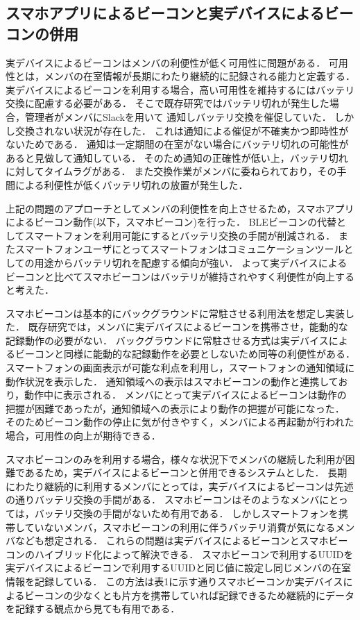 
\subsection{スマホアプリによるビーコンと実デバイスによるビーコンの併用}


実デバイスによるビーコンはメンバの利便性が低く可用性に問題がある．
可用性とは，メンバの在室情報が長期にわたり継続的に記録される能力と定義する．
実デバイスによるビーコンを利用する場合，高い可用性を維持するにはバッテリ交換に配慮する必要がある．
そこで既存研究ではバッテリ切れが発生した場合，管理者がメンバにSlackを用いて
通知しバッテリ交換を催促していた．
しかし交換されない状況が存在した．
これは通知による催促が不確実かつ即時性がないためである．
通知は一定期間の在室がない場合にバッテリ切れの可能性があると見做して通知している．
そのため通知の正確性が低い上，バッテリ切れに対してタイムラグがある．
また交換作業がメンバに委ねられており，その手間による利便性が低くバッテリ切れの放置が発生した．


上記の問題のアプローチとしてメンバの利便性を向上させるため，スマホアプリによるビーコン動作(以下，スマホビーコン)を行った．
BLEビーコンの代替としてスマートフォンを利用可能にするとバッテリ交換の手間が削減される．
またスマートフォンユーザにとってスマートフォンはコミュニケーションツールとしての用途からバッテリ切れを配慮する傾向が強い．
よって実デバイスによるビーコンと比べてスマホビーコンはバッテリが維持されやすく利便性が向上すると考えた．

スマホビーコンは基本的にバックグラウンドに常駐させる利用法を想定し実装した．
既存研究では，メンバに実デバイスによるビーコンを携帯させ，能動的な記録動作の必要がない．
バックグラウンドに常駐させる方式は実デバイスによるビーコンと同様に能動的な記録動作を必要としないため同等の利便性がある．
スマートフォンの画面表示が可能な利点を利用し，スマートフォンの通知領域に動作状況を表示した．
通知領域への表示はスマホビーコンの動作と連携しており，動作中に表示される．
メンバにとって実デバイスによるビーコンは動作の把握が困難であったが，通知領域への表示により動作の把握が可能になった．
そのためビーコン動作の停止に気が付きやすく，メンバによる再起動が行われた場合，可用性の向上が期待できる．



スマホビーコンのみを利用する場合，様々な状況下でメンバの継続した利用が困難であるため，実デバイスによるビーコンと併用できるシステムとした．
長期にわたり継続的に利用するメンバにとっては，実デバイスによるビーコンは先述の通りバッテリ交換の手間がある．
スマホビーコンはそのようなメンバにとっては，バッテリ交換の手間がないため有用である．
しかしスマートフォンを携帯していないメンバ，スマホビーコンの利用に伴うバッテリ消費が気になるメンバなども想定される．
これらの問題は実デバイスによるビーコンとスマホビーコンのハイブリッド化によって解決できる．
スマホビーコンで利用するUUIDを実デバイスによるビーコンで利用するUUIDと同じ値に設定し同じメンバの在室情報を記録している．
この方法は表1に示す通りスマホビーコンか実デバイスによるビーコンの少なくとも片方を携帯していれば記録できるため継続的にデータを記録する観点から見ても有用である．

